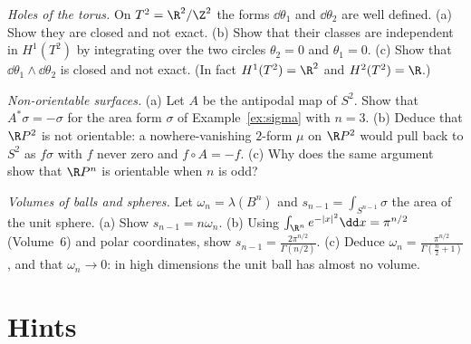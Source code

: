 \begin{exercise}[$\star$]\label{ex:toruscohomology}
\emph{Holes of the torus.} On $T^2=\R^2/\Z^2$ the forms $\dd\theta_1$ and $\dd\theta_2$ are well defined. (a) Show they are closed and not exact. (b) Show that their classes
are independent in $H^1(T^2)$ by integrating over the two circles $\theta_2=0$ and $\theta_1=0$. (c) Show that $\dd\theta_1\wedge\dd\theta_2$ is closed and not exact. (In fact
$H^1(T^2)=\R^2$ and $H^2(T^2)=\R$.)
\end{exercise}

\begin{exercise}[$\star\star$]\label{ex:mobius}
\emph{Non-orientable surfaces.} (a) Let $A$ be the antipodal map of $S^2$. Show that $A^*\sigma=-\sigma$ for the area form $\sigma$ of Example~\ref{ex:sigma} with $n=3$. (b) Deduce that
$\R P^2$ is not orientable: a nowhere-vanishing $2$-form $\mu$ on $\R P^2$ would pull back to $S^2$ as $f\sigma$ with $f$ never zero and $f\circ A=-f$. (c) Why does the same argument
show that $\R P^n$ is orientable when $n$ is odd?
\end{exercise}

\begin{exercise}[$\star\star$]\label{ex:spherevolume}
\emph{Volumes of balls and spheres.} Let $\omega_n=\lambda(B^n)$ and $s_{n-1}=\int_{S^{n-1}}\sigma$ the area of the unit sphere. (a) Show $s_{n-1}=n\omega_n$. (b) Using
$\int_{\R^n}e^{-|x|^2}\dd x=\pi^{n/2}$ (Volume~6) and polar coordinates, show $s_{n-1}=\frac{2\pi^{n/2}}{\Gamma(n/2)}$. (c) Deduce $\omega_n=\frac{\pi^{n/2}}{\Gamma(\frac n2+1)}$, and that
$\omega_n\to0$: in high dimensions the unit ball has almost no volume.
\end{exercise}

\section{Hints}

